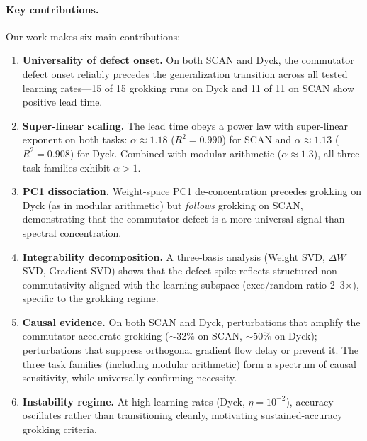 \documentclass[11pt]{article}
\begin{document}
\paragraph{Key contributions.} Our work makes six main contributions:
\begin{enumerate}
  \item \textbf{Universality of defect onset.} On both SCAN and Dyck, the commutator defect onset reliably precedes the generalization transition across all tested learning rates---15 of 15 grokking runs on Dyck and 11 of 11 on SCAN show positive lead time.

  \item \textbf{Super-linear scaling.} The lead time obeys a power law with super-linear exponent on both tasks: $\alpha \approx 1.18$ ($R^2 = 0.990$) for SCAN and $\alpha \approx 1.13$ ($R^2 = 0.908$) for Dyck. Combined with modular arithmetic ($\alpha \approx 1.3$), all three task families exhibit $\alpha > 1$.

  \item \textbf{PC1 dissociation.} Weight-space PC1 de-concentration precedes grokking on Dyck (as in modular arithmetic) but \emph{follows} grokking on SCAN, demonstrating that the commutator defect is a more universal signal than spectral concentration.

  \item \textbf{Integrability decomposition.} A three-basis analysis (Weight SVD, $\Delta W$ SVD, Gradient SVD) shows that the defect spike reflects structured non-commutativity aligned with the learning subspace (exec/random ratio 2--3$\times$), specific to the grokking regime.

  \item \textbf{Causal evidence.} On both SCAN and Dyck, perturbations that amplify the commutator accelerate grokking (${\sim}32\%$ on SCAN, ${\sim}50\%$ on Dyck); perturbations that suppress orthogonal gradient flow delay or prevent it. The three task families (including modular arithmetic) form a spectrum of causal sensitivity, while universally confirming necessity.

  \item \textbf{Instability regime.} At high learning rates (Dyck, $\eta = 10^{-2}$), accuracy oscillates rather than transitioning cleanly, motivating sustained-accuracy grokking criteria.
\end{enumerate}
\end{document}
